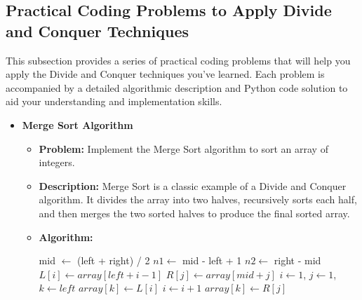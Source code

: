 \documentclass[12pt]{book} %
\begin{document}
\subsection{Practical Coding Problems to Apply Divide and Conquer Techniques}
This subsection provides a series of practical coding problems that will help you apply the Divide and Conquer techniques you've learned. Each problem is accompanied by a detailed algorithmic description and Python code solution to aid your understanding and implementation skills.

\begin{itemize}
    \item \textbf{Merge Sort Algorithm}
    \begin{itemize}
        \item \textbf{Problem:} Implement the Merge Sort algorithm to sort an array of integers.
        \item \textbf{Description:} Merge Sort is a classic example of a Divide and Conquer algorithm. It divides the array into two halves, recursively sorts each half, and then merges the two sorted halves to produce the final sorted array.
        \item \textbf{Algorithm:}
            \begin{algorithm}[H]
            \caption{Merge Sort}
            \begin{algorithmic}[1]
                    \State mid $\gets$ (left + right) / 2
                    \State {}
                    \State {}
                    \State {}
                \EndIf
            \EndProcedure
                \State $n1 \gets$ mid - left + 1
                \State $n2 \gets$ right - mid
                \State {}
                    \State $L[i] \gets array[left + i - 1]$
                \EndFor
                    \State $R[j] \gets array[mid + j]$
                \EndFor
                \State $i \gets 1$, $j \gets 1$, $k \gets left$
                        \State $array[k] \gets L[i]$
                        \State $i \gets i + 1$
                    \Else
                        \State $array[k] \gets R[j]$

\end{algorithmic}
\end{algorithm}
\end{itemize}
\end{itemize}
\end{document}

